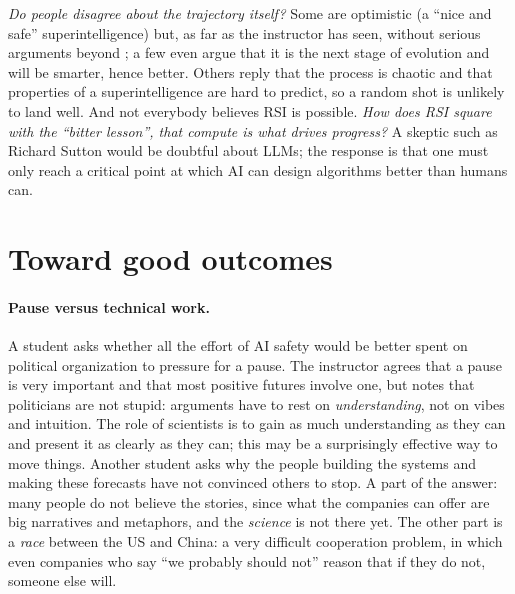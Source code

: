 \begin{discussion}
\emph{Do people disagree about the trajectory itself?} Some are optimistic (a ``nice and safe'' superintelligence) but, as far as the instructor has seen, without serious arguments beyond ; a few even argue that it is the next stage of evolution and will be smarter, hence better.
Others reply that the process is chaotic and that properties of a superintelligence are hard to predict, so a random shot is unlikely to land well. And not everybody believes RSI is possible.
\emph{How does RSI square with the ``bitter lesson'', that compute is what drives progress?} A skeptic such as Richard Sutton would be doubtful about LLMs; the response is that one must only reach a critical point at which AI can design algorithms better than humans can.
\end{discussion}

\section{Toward good outcomes}\label{sec:L1-good}
\paragraph{Pause versus technical work.}
A student asks whether all the effort of AI safety would be better spent on political organization to pressure for a pause. The instructor agrees that a pause is very important and that most positive futures involve one, but notes that politicians are not stupid:
arguments have to rest on \emph{understanding}, not on vibes and intuition. The role of scientists is to gain as much understanding as they can and present it as clearly as they can; this may be a surprisingly effective way to move things. Another student asks why the people building the systems
and making these forecasts have not convinced others to stop. A part of the answer: many people do not believe the stories, since what the companies can offer are big narratives and metaphors, and the \emph{science} is not there yet. The other part is a \emph{race} between the US and China:
a very difficult cooperation problem, in which even companies who say ``we probably should not'' reason that if they do not, someone else will.

